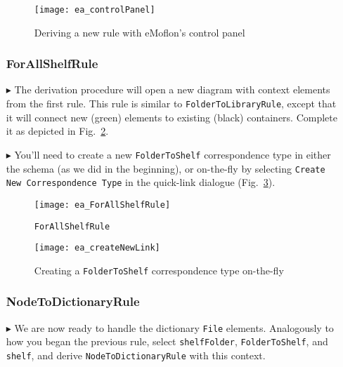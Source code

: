 \begin{itemize}
\begin{figure}[htbp]
\begin{center}
  \texttt{[image: ea\_controlPanel]}
  \caption{Deriving a new rule with eMoflon's control panel}
  \label{ea:controlPanel}
\end{center}
\end{figure}

\newpage

\subsubsection{ForAllShelfRule} %

\item[$\blacktriangleright$] The derivation procedure will open a new diagram with context elements from the first rule. This rule is similar to
\texttt{FolderToLibraryRule}, except that it will connect new (green) elements to existing (black) containers. Complete it as depicted in
Fig.~\ref{ea:ForAllShelves_Complete}.

\item[$\blacktriangleright$] You'll need to create a new \texttt{FolderToShelf} correspondence type in either the schema (as we did in the beginning), or
on-the-fly by selecting \texttt{Create New Correspondence Type} in the quick-link dialogue (Fig.~\ref{ea:corrOnTheFly}).

\begin{figure}[htbp]
\begin{center}
  \texttt{[image: ea\_ForAllShelfRule]}
  \caption{\texttt{ForAllShelfRule}}
  \label{ea:ForAllShelves_Complete}
\end{center}
\end{figure}

\begin{figure}[htbp]
\begin{center}
  \texttt{[image: ea\_createNewLink]}
  \caption{Creating a \texttt{FolderToShelf} correspondence type on-the-fly}
  \label{ea:corrOnTheFly}
\end{center}
\end{figure}

\subsubsection{NodeToDictionaryRule} %

\item[$\blacktriangleright$] We are now ready to handle the dictionary \texttt{File} elements. Analogously to how you began the previous rule, select
\texttt{shelfFolder}, \texttt{FolderToShelf}, and \texttt{shelf}, and derive \texttt{NodeToDictionaryRule} with this context.


\end{itemize}
